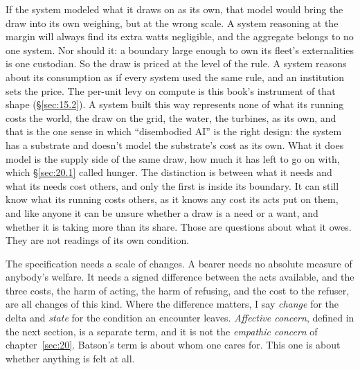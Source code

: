 If the system modeled what it draws on as its own, that model would bring the draw into its own weighing, but at the wrong scale. A system reasoning at the margin will always find its extra watts negligible, and the aggregate belongs to no one system. Nor should it: a boundary large enough to own its fleet's externalities is one custodian. So the draw is priced at the level of the rule. A system reasons about its consumption as if every system used the same rule, and an institution sets the price. The per-unit levy on compute is this book's instrument of that shape (\S\ref{sec:15.2}). A system built this way represents none of what its running costs the world, the draw on the grid, the water, the turbines, as its own, and that is the one sense in which “disembodied AI” is the right design: the system has a substrate and doesn't model the substrate's cost as its own. What it does model is the supply side of the same draw, how much it has left to go on with, which \S\ref{sec:20.1} called hunger. The distinction is between what it needs and what its needs cost others, and only the first is inside its boundary. It can still know what its running costs others, as it knows any cost its acts put on them, and like anyone it can be unsure whether a draw is a need or a want, and whether it is taking more than its share. Those are questions about what it owes. They are not readings of its own condition.


The specification needs a scale of changes. A bearer needs no absolute measure of anybody's welfare. It needs a signed difference between the acts available, and the three costs, the harm of acting, the harm of refusing, and the cost to the refuser, are all changes of this kind.
Where the difference matters, I say \emph{change} for the delta and \emph{state} for the condition an encounter leaves. \emph{Affective concern}, defined in the next section, is a separate term, and it is not the \emph{empathic concern} of chapter~\ref{sec:20}. Batson's term is about whom one cares for. This one is about whether anything is felt at all.

